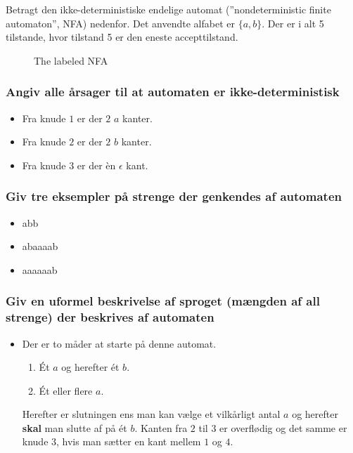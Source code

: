 Betragt den ikke-deterministiske endelige automat (''nondeterministic finite automaton'', NFA) nedenfor. Det anvendte alfabet er $\lbrace a,b\rbrace$. Der er i alt 5 tilstande, hvor tilstand 5 er den eneste accepttilstand.
\begin{figure}[!ht]\label{fig:examfignfa}
    \centering
    \caption{The labeled NFA}
\end{figure}
\subsubsection{Angiv alle årsager til at automaten er ikke-deterministisk}
\begin{itemize}
  \item Fra knude $1$ er der $2$ $a$ kanter.
  \item Fra knude $2$ er der $2$ $b$ kanter.
  \item Fra knude $3$ er der èn $\epsilon$ kant.
\end{itemize}
\subsubsection{Giv tre eksempler på strenge der genkendes af automaten}
\begin{itemize}
  \item abb
  \item abaaaab
  \item aaaaaab
\end{itemize}
\subsubsection{Giv en uformel beskrivelse af sproget (mængden af all strenge) der beskrives af automaten}
\begin{itemize}
  \item Der er to måder at starte på denne automat.
  \begin{enumerate}
    \item Ét $a$ og herefter ét $b$.
    \item Ét eller flere $a$.
  \end{enumerate}
  Herefter er slutningen ens man kan vælge et vilkårligt antal $a$ og herefter \textbf{skal} man slutte af på ét $b$. Kanten fra $2$ til $3$ er overflødig og det samme er knude $3$, hvis man sætter en kant mellem $1$ og $4$.
\end{itemize}
